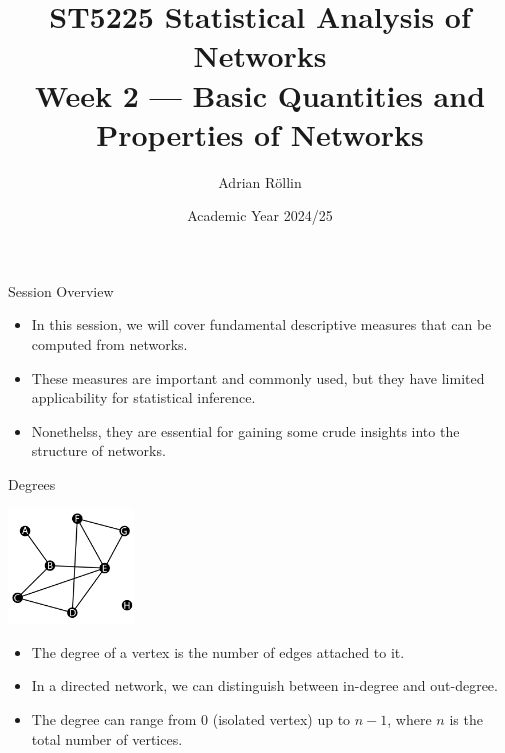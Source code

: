 \documentclass[9pt,handout]{beamer}
\let\olditem\item
\renewcommand{\item}{\olditem\vfill}
\begin{document}
\title{ST5225 Statistical Analysis of Networks \\[2ex]Week 2 --- Basic Quantities and Properties of Networks}
\author{Adrian Röllin}
\date{Academic Year 2024/25}

\begin{frame}
  \titlepage
\end{frame}


\begin{frame}{Session Overview}
  \begin{itemize}
    \item In this session, we will cover fundamental descriptive measures that can be computed from networks.
    \item These measures are important and commonly used, but they have limited applicability for statistical inference. \item Nonethelss, they are essential for gaining some crude insights into the structure of networks.
  \end{itemize}
\end{frame}

\begin{frame}{Degrees}
  \begin{center}
    \includegraphics[width=0.25\textwidth]{week_02_lecture_img_01}
  \end{center}    
  \begin{itemize}
    \item The degree of a vertex is the number of edges attached to it. 
    \item In a directed network, we can distinguish between in-degree and out-degree.
    \item The degree can range from 0 (isolated vertex) up to $n-1$, where $n$ is the total number of vertices.
  \end{itemize}

\end{frame}
\end{document}
